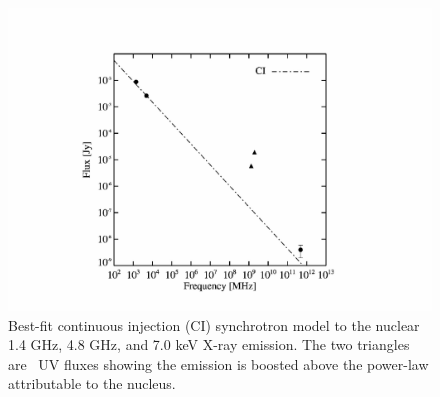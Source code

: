\begin{figure}
  \begin{center}
    \begin{minipage}{\linewidth}
      \includegraphics*[width=\textwidth, trim=10mm 5mm 10mm 10mm, clip]{arx_radiofit.eps}
    \end{minipage}
    \caption{Best-fit continuous injection (CI) synchrotron model to
      the nuclear 1.4 GHz, 4.8 GHz, and 7.0 keV X-ray emission. The
      two triangles are \galex\ UV fluxes showing the emission is
      boosted above the power-law attributable to the nucleus.}
    \label{fig:sync}
    \end{center}
\end{figure}

